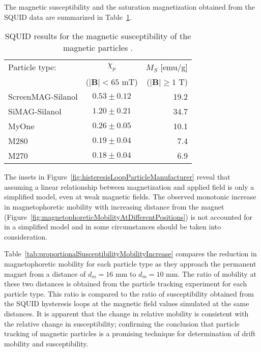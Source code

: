 The magnetic susceptibility and the saturation magnetization obtained from the SQUID data are summarized in Table~\ref{tab:particleSusceptibility}.

\begin{table}[htb]
\begin{center}
\caption[Experimentally found magnetophoretic mobility and susceptibility of superparamagnetic particles using SQUID]{SQUID results for the magnetic susceptibility of the magnetic particles .}\vspace{1ex}
\label{tab:particleSusceptibility}
\begin{tabular}{lcr}\hline
Particle type:  	&  $\chi_{p}$  				& $M_{S}$ [emu/g]  \\ 
 					& ($|\mathbf{B}|< 65$ mT) 	& ($|\mathbf{B}|\geq 1$ T)\\ \hline
ScreenMAG-Silanol 	& $0.53 \pm 0.12$ 						& 19.2 \\
SiMAG-Silanol 		& $1.20 \pm 0.21$ 						& 34.7 \\
MyOne 				& $0.26 \pm 0.05$ 						& 10.1 \\
M280 				& $0.19 \pm 0.04$ 						& 7.4 \\
M270 				& $0.18 \pm 0.04$ 						& 6.9 \\ \hline
\end{tabular}
\end{center}
\end{table}

The insets in Figure~\ref{fig:histeresisLoopParticleManufacturer} reveal that assuming a linear relationship between magnetization and applied field is only a simplified model, even at weak magnetic fields. The observed monotonic increase in magnetophoretic mobility with increasing distance from the magnet (Figure~\ref{fig:magnetophoreticMobilityAtDifferentPositions}) is not accounted for in a simplified model and in some circumstances should be taken into consideration.

Table~\ref{tab:proportionalSusceptibilityMobilityIncrease} compares the reduction in magnetophoretic mobility for each particle type as they approach the permanent magnet from a distance of $d_{m} = 16$ mm to $d_{m} = 10$ mm.  The ratio of mobility at these two distances is obtained from the particle tracking experiment for each particle type.  This ratio is compared to the ratio of susceptibility obtained from the SQUID hysteresis loops at the magnetic field values simulated at the same distances. It is apparent that the change in relative mobility is consistent with the relative change in susceptibility; confirming the conclusion that particle tracking of magnetic particles is a promising technique for determination of drift mobility and susceptibility.


